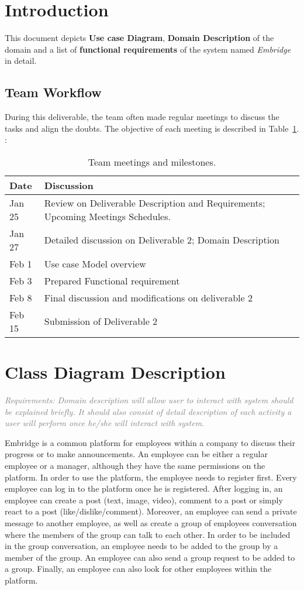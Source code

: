 \documentclass[12pt,a4paper]{article}
\newcommand{\reqs}[2][gray]{\textit{\textcolor{#1}{Requirements: #2}}}
\begin{document}
\section*{Introduction}

This document depicts \textbf{Use case Diagram}, \textbf{Domain Description} of the domain and a list of \textbf{functional requirements} of the system named \textit{Embridge} in detail.

\subsection*{Team Workflow}

During this deliverable, the team often made regular meetings to discuss the tasks and align the doubts. The objective of each meeting is described in Table~\ref{tab:meeting}. : 

\begin{table}[h]
\centering
\caption{Team meetings and milestones.}
\label{tab:meeting}
\begin{tabularx}{\textwidth}{@{}lX@{}}
\toprule
Date & Discussion \\ \midrule
Jan 25 & Review on Deliverable Description and Requirements; Upcoming Meetings Schedules. \\
Jan 27 & Detailed discussion on Deliverable 2; Domain Description\\
Feb 1 & Use case Model overview \\
Feb 3 &  Prepared Functional requirement \\
Feb 8 &  Final discussion and modifications on deliverable 2  \\
Feb 15 & Submission of Deliverable 2 \\
\bottomrule
\end{tabularx}
\end{table}
\section{Class Diagram Description} \label{gqm}

\reqs{
Domain description will allow user to interact
with system should be explained briefly. It should also consist of detail description of each activity a user will perform once he/she will interact with system.
}


Embridge is a common platform for employees within a company to discuss their progress or to make announcements. An employee can be either a regular employee or a manager, although they have the same permissions on the platform. In order to use the platform, the employee needs to register first. Every employee can log in to the platform once he is registered. After logging in, an employee can create a post (text, image, video), comment to a post or simply react to a post (like/dislike/comment). Moreover, an employee can send a private message to another employee, as well as create a group of employees conversation where the members of the group can talk to each other. In order to be included in the group conversation, an employee needs to be added to the group by a member of the group. An employee can also send a group request to be added to a group. Finally, an employee can also look for other employees within the platform.
\end{document}
